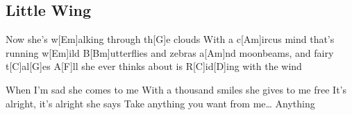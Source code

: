 \subsection*{Little Wing   }
\begin{guitar}
Now she's w[Em]alking through th[G]e clouds
With a c[Am]ircus mind that's running w[Em]ild
B[Bm]utterflies and zebras a[Am]nd moonbeams, and fairy t[C]al[G]es
A[F]ll she ever thinks about is 
R[C]id[D]ing with the wind


When I'm sad she comes to me
With a thousand smiles she gives to me free
It's alright, it's alright she says
Take anything you want from me\ldots
Anything

\end{guitar}

